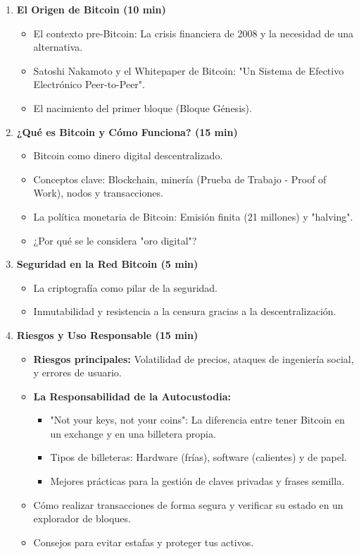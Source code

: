 \documentclass[12pt,a4paper]{article}
\begin{document}
\begin{enumerate}
    \item \textbf{El Origen de Bitcoin (10 min)}
    \begin{itemize}
        \item El contexto pre-Bitcoin: La crisis financiera de 2008 y la necesidad de una alternativa.
        \item Satoshi Nakamoto y el Whitepaper de Bitcoin: "Un Sistema de Efectivo Electrónico Peer-to-Peer".
        \item El nacimiento del primer bloque (Bloque Génesis).
    \end{itemize}
    
    \item \textbf{¿Qué es Bitcoin y Cómo Funciona? (15 min)}
    \begin{itemize}
        \item Bitcoin como dinero digital descentralizado.
        \item Conceptos clave: Blockchain, minería (Prueba de Trabajo - Proof of Work), nodos y transacciones.
        \item La política monetaria de Bitcoin: Emisión finita (21 millones) y "halving".
        \item ¿Por qué se le considera "oro digital"?
    \end{itemize}
    
    \item \textbf{Seguridad en la Red Bitcoin (5 min)}
    \begin{itemize}
        \item La criptografía como pilar de la seguridad.
        \item Inmutabilidad y resistencia a la censura gracias a la descentralización.
    \end{itemize}
    
    \item \textbf{Riesgos y Uso Responsable (15 min)}
    \begin{itemize}
        \item \textbf{Riesgos principales:} Volatilidad de precios, ataques de ingeniería social, y errores de usuario.
        \item \textbf{La Responsabilidad de la Autocustodia:}
        \begin{itemize}
            \item "Not your keys, not your coins": La diferencia entre tener Bitcoin en un exchange y en una billetera propia.
            \item Tipos de billeteras: Hardware (frías), software (calientes) y de papel.
            \item Mejores prácticas para la gestión de claves privadas y frases semilla.
        \end{itemize}
        \item Cómo realizar transacciones de forma segura y verificar su estado en un explorador de bloques.
        \item Consejos para evitar estafas y proteger tus activos.
    \end{itemize}
\end{enumerate}
\end{document}
